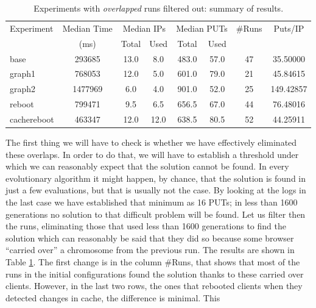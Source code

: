 \documentclass[runningheads,a4paper]{llncs}\usepackage[]{graphicx}\usepackage[]{color}
\begin{document}
%
\begin{table}
  \caption{Experiments with {\em overlapped} runs filtered out: summary of results. \label{tab:filtered}}
\begin{center}
\begin{tabular}{|l|c|c|c|c|c|c|c|}
\hline
Experiment & Median Time & \multicolumn{2}{|c|}{Median IPs} &\multicolumn{2}{|c|}{Median PUTs} & \#Runs &  Puts/IP \\
&   (ms)        & Total & Used & Total & Used &  & \\
\hline
base & 293685 & 13.0 & 8.0 & 483.0 & 57.0 & 47 & 35.50000\\
\hline
graph1 & 768053 & 12.0 & 5.0 & 601.0 & 79.0 & 21 & 45.84615\\
graph2 & 1477969 & 6.0 & 4.0 & 901.0 & 52.0 & 25 & 149.42857\\
\hline
reboot & 799471 & 9.5 & 6.5 & 656.5 & 67.0 & 44 & 76.48016\\
\hline
cachereboot & 463347 & 12.0 & 12.0 & 638.5 & 80.5 & 52 & 44.25911\\
\hline
\end{tabular}
%
\end{center}
\end{table}
%
The first thing we will have to check is whether we have effectively eliminated these
overlaps. In order to do that, we will have to establish a threshold
under which we can reasonably expect that the solution cannot be found. In every
evolutionary algorithm it might happen, by chance, that the solution
is found in just a few evaluations, but that is usually not the
case. By looking at the logs in the last case we have established that
minimum as 16 PUTs; in less than 1600 generations no solution to that
difficult problem will be found. Let us filter then the runs,
eliminating those that used less than 1600 generations to find the
solution which can reasonably be said that they did so because some
browser ``carried over'' a chromosome from the previous run. The
results are shown in Table \ref{tab:filtered}. The first change is in
the column \#Runs, that shows that most of the runs in the initial
configurations found the solution thanks to these carried over
clients. However, in the last two rows, the ones that rebooted clients
when they detected changes in cache, the difference is minimal. This
\end{document}
